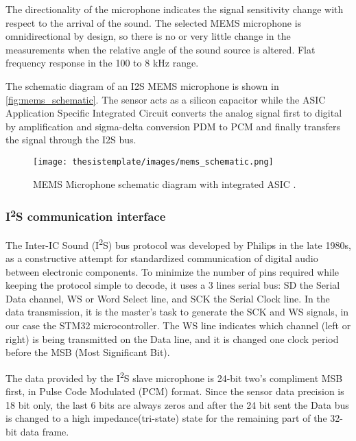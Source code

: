 The directionality of the microphone indicates the signal sensitivity change with respect to the arrival of the sound. The selected MEMS microphone is omnidirectional by design, so there is no or very little change in the measurements when the relative angle of the sound source is altered. Flat frequency response in the 100 to 8 kHz range.

The schematic diagram of an I2S MEMS microphone is shown in \autoref{fig:mems_schematic}. The sensor acts as a silicon capacitor while the ASIC Application Specific Integrated Circuit converts the analog signal first to digital by amplification and sigma-delta conversion PDM to PCM and finally transfers the signal through the I2S bus.
\begin{figure}[h!]
  \begin{center}
    \texttt{[image: thesistemplate/images/mems\_schematic.png]}
    \caption{MEMS Microphone schematic diagram with integrated ASIC \cite{mems_tutor}.}
    \label{fig:mems_schematic}
  \end{center}
\end{figure}



\subsubsection{I\textsuperscript{2}S communication interface}

The Inter-IC Sound (I\textsuperscript{2}S) bus protocol was developed by Philips in the late 1980s, as a constructive attempt for standardized communication of digital audio between electronic components. To minimize the number of pins required while keeping the protocol simple to decode, it uses a 3 lines serial bus: SD the Serial Data channel, WS or Word Select line, and SCK the Serial Clock line. In the data transmission, it is the master's task to generate the SCK and WS signals, in our case the STM32 microcontroller. The WS line indicates which channel (left or right) is being transmitted on the Data line, and it is changed one clock period before the MSB (Most Significant Bit).

The data provided by the I\textsuperscript{2}S slave microphone is 24-bit two's compliment MSB first, in Pulse Code Modulated (PCM) format. Since the sensor data precision is 18 bit only, the last 6 bits are always zeros and after the 24 bit sent the Data bus is changed to a high impedance(tri-state) state for the remaining part of the 32-bit data frame.

